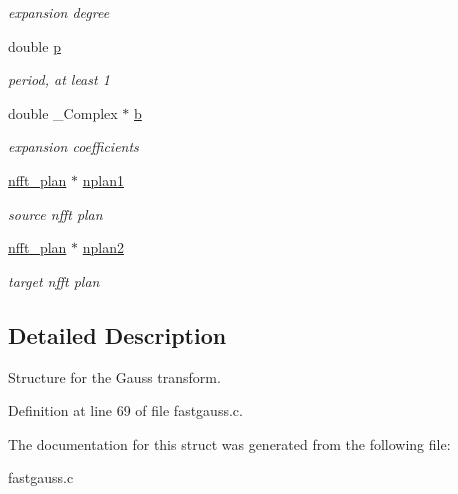 \begin{CompactItemize}
\begin{CompactList}\small\item\em expansion degree \item\end{CompactList}\item 
\hypertarget{structfgt__plan_c6eda4d64140b8d5d8ef93e55e5f9b73}{
double \hyperlink{structfgt__plan_c6eda4d64140b8d5d8ef93e55e5f9b73}{p}}
\label{structfgt__plan_c6eda4d64140b8d5d8ef93e55e5f9b73}

\begin{CompactList}\small\item\em period, at least 1 \item\end{CompactList}\item 
\hypertarget{structfgt__plan_0a52777ff0982564c930c107a92d29d4}{
double \_\-Complex $\ast$ \hyperlink{structfgt__plan_0a52777ff0982564c930c107a92d29d4}{b}}
\label{structfgt__plan_0a52777ff0982564c930c107a92d29d4}

\begin{CompactList}\small\item\em expansion coefficients \item\end{CompactList}\item 
\hypertarget{structfgt__plan_a610ca4d19d67b72eab19327b373e3e2}{
\hyperlink{structnfft__plan}{nfft\_\-plan} $\ast$ \hyperlink{structfgt__plan_a610ca4d19d67b72eab19327b373e3e2}{nplan1}}
\label{structfgt__plan_a610ca4d19d67b72eab19327b373e3e2}

\begin{CompactList}\small\item\em source nfft plan \item\end{CompactList}\item 
\hypertarget{structfgt__plan_456c907589235a56d6f733220a40a163}{
\hyperlink{structnfft__plan}{nfft\_\-plan} $\ast$ \hyperlink{structfgt__plan_456c907589235a56d6f733220a40a163}{nplan2}}
\label{structfgt__plan_456c907589235a56d6f733220a40a163}

\begin{CompactList}\small\item\em target nfft plan \item\end{CompactList}\end{CompactItemize}


\subsection{Detailed Description}
Structure for the Gauss transform. 

Definition at line 69 of file fastgauss.c.

The documentation for this struct was generated from the following file:\begin{CompactItemize}
\item 
fastgauss.c\end{CompactItemize}
